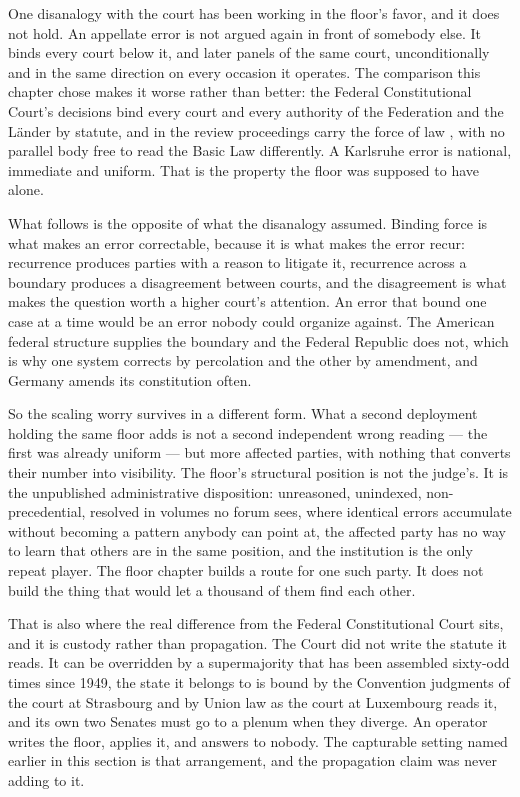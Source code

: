 One disanalogy with the court has been working in the floor's favor, and it does not hold. An appellate error is not argued again in front of somebody else. It binds every court below it, and later panels of the same court, unconditionally and in the same direction on every occasion it operates. The comparison this chapter chose makes it worse rather than better: the Federal Constitutional Court's decisions bind every court and every authority of the Federation and the Länder by statute, and in the review proceedings carry the force of law \autocite{germany1951bverfgg}, with no parallel body free to read the Basic Law differently. A Karlsruhe error is national, immediate and uniform. That is the property the floor was supposed to have alone.

What follows is the opposite of what the disanalogy assumed. Binding force is what makes an error correctable, because it is what makes the error recur: recurrence produces parties with a reason to litigate it, recurrence across a boundary produces a disagreement between courts, and the disagreement is what makes the question worth a higher court's attention. An error that bound one case at a time would be an error nobody could organize against. The American federal structure supplies the boundary and the Federal Republic does not, which is why one system corrects by percolation and the other by amendment, and Germany amends its constitution often.

So the scaling worry survives in a different form. What a second deployment holding the same floor adds is not a second independent wrong reading — the first was already uniform — but more affected parties, with nothing that converts their number into visibility. The floor's structural position is not the judge's. It is the unpublished administrative disposition: unreasoned, unindexed, non-precedential, resolved in volumes no forum sees, where identical errors accumulate without becoming a pattern anybody can point at, the affected party has no way to learn that others are in the same position, and the institution is the only repeat player. The floor chapter builds a route for one such party. It does not build the thing that would let a thousand of them find each other.

That is also where the real difference from the Federal Constitutional Court sits, and it is custody rather than propagation. The Court did not write the statute it reads. It can be overridden by a supermajority that has been assembled sixty-odd times since 1949, the state it belongs to is bound by the Convention judgments of the court at Strasbourg and by Union law as the court at Luxembourg reads it, and its own two Senates must go to a plenum when they diverge. An operator writes the floor, applies it, and answers to nobody. The capturable setting named earlier in this section is that arrangement, and the propagation claim was never adding to it.

